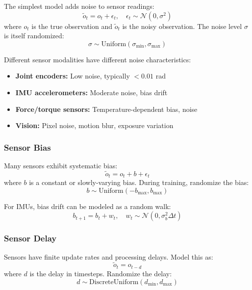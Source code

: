 The simplest model adds noise to sensor readings:
\begin{equation}
\tilde{o}_t = o_t + \epsilon_t, \quad \epsilon_t \sim \mathcal{N}(0, \sigma^2)
\end{equation}
where $o_t$ is the true observation and $\tilde{o}_t$ is the noisy observation. The noise level $\sigma$ is itself randomized:
\begin{equation}
\sigma \sim \text{Uniform}(\sigma_{\min}, \sigma_{\max})
\end{equation}

Different sensor modalities have different noise characteristics:
\begin{itemize}
    \item \textbf{Joint encoders:} Low noise, typically $< 0.01$ rad
    \item \textbf{IMU accelerometers:} Moderate noise, bias drift
    \item \textbf{Force/torque sensors:} Temperature-dependent bias, noise
    \item \textbf{Vision:} Pixel noise, motion blur, exposure variation
\end{itemize}

\subsubsection{Sensor Bias}

Many sensors exhibit systematic bias:
\begin{equation}
\tilde{o}_t = o_t + b + \epsilon_t
\end{equation}
where $b$ is a constant or slowly-varying bias. During training, randomize the bias:
\begin{equation}
b \sim \text{Uniform}(-b_{\max}, b_{\max})
\end{equation}

For IMUs, bias drift can be modeled as a random walk:
\begin{equation}
b_{t+1} = b_t + w_t, \quad w_t \sim \mathcal{N}(0, \sigma_b^2 \Delta t)
\end{equation}

\subsubsection{Sensor Delay}

Sensors have finite update rates and processing delays. Model this as:
\begin{equation}
\tilde{o}_t = o_{t-d}
\end{equation}
where $d$ is the delay in timesteps. Randomize the delay:
\begin{equation}
d \sim \text{DiscreteUniform}(d_{\min}, d_{\max})
\end{equation}

